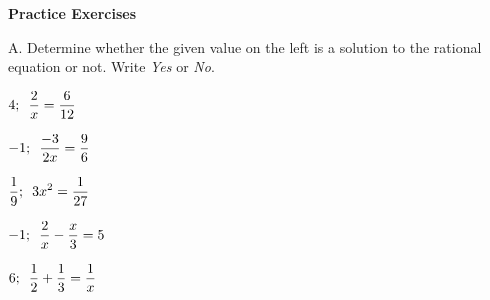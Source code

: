 \textbf{Practice Exercises}

\vspce

A. Determine whether the given value on the left is a solution to the rational equation or not. Write \emph{Yes} or \emph{No}.
\begin{enumerate}[label = \arabic*. ]
\begin{multicols}{3}
\item \hspce $4;\hspace{0.5em}  \displaystyle \frac{2}{x} = \displaystyle \frac{6}{12} $
\item  \hspce $-1;\hspace{0.5em}  \displaystyle \frac{-3}{2x} = \displaystyle \frac{9}{6} $
\item  \hspce $\displaystyle \frac{1}{9} ;\hspace{0.5em}  3x^2 = \displaystyle \frac{1}{27} $
\item  \hspce $-1;\hspace{0.5em}  \displaystyle \frac{2}{x} - \dfrac{x}{3}  = 5 $
\item  \hspce $6;\hspace{0.5em}  \displaystyle \frac{1}{2} + \dfrac{1}{3}  = \displaystyle \frac{1}{x} $
\end{multicols} 
\end{enumerate}  